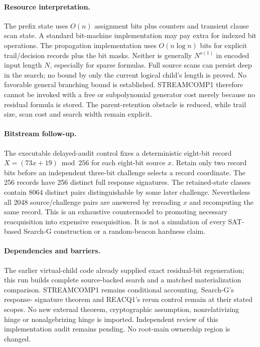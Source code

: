 \documentclass[11pt]{article}
\begin{document}
\paragraph{Resource interpretation.}
The prefix state uses $O(n)$ assignment bits plus counters and transient clause
scan state. A standard bit-machine implementation may pay extra for indexed bit
operations. The propagation implementation uses $O(n\log n)$ bits for explicit
trail/decision records plus the bit masks. Neither is generally $N^{o(1)}$ in
encoded input length $N$, especially for sparse formulas. Full source scans
can persist deep in the search; no bound by only the current logical child's
length is proved. No favorable general branching bound is established.
STREAMCOMP1 therefore cannot be invoked with a free or subpolynomial generator
cost merely because no residual formula is stored. The parent-retention obstacle
is reduced, while trail size, scan cost and search width remain explicit.

\paragraph{Bitstream follow-up.}
The executable delayed-audit control fixes a deterministic eight-bit record
$X=(73x+19)\bmod256$ for each eight-bit source $x$. Retain only two record bits
before an independent three-bit challenge selects a record coordinate.
The 256 records have 256 distinct full response signatures. The retained-state
classes contain 8064 distinct pairs distinguishable by some later challenge.
Nevertheless all 2048 source/challenge pairs are answered by rereading $x$ and
recomputing the same record. This is an exhaustive countermodel to promoting
necessary reacquisition into expensive reacquisition. It is not a simulation
of every SAT-based Search-G construction or a random-beacon hardness claim.

\paragraph{Dependencies and barriers.}
The earlier virtual-child code already supplied exact residual-bit regeneration;
this run builds complete source-backed search and a matched materialization
comparison. STREAMCOMP1 remains conditional accounting. Search-G's response-
signature theorem and REACQ1's rerun control remain at their stated scopes.
No new external theorem, cryptographic assumption, nonrelativizing hinge or
nonalgebrizing hinge is imported. Independent review of this implementation
audit remains pending. No root-main ownership region is changed.
\end{document}

